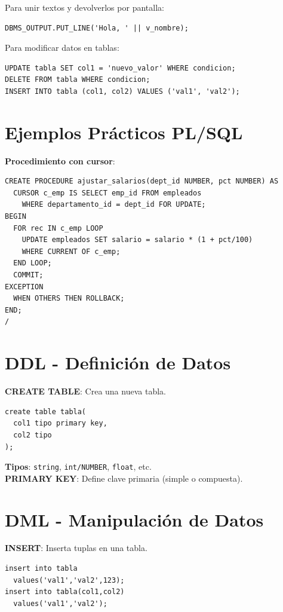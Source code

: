 \documentclass[8pt,a4paper,twocolumn]{article}
\begin{document}
Para unir textos y devolverlos por pantalla:
\begin{lstlisting}
DBMS_OUTPUT.PUT_LINE('Hola, ' || v_nombre);
\end{lstlisting}

Para modificar datos en tablas:
\begin{lstlisting}
UPDATE tabla SET col1 = 'nuevo_valor' WHERE condicion;
DELETE FROM tabla WHERE condicion;
INSERT INTO tabla (col1, col2) VALUES ('val1', 'val2');
\end{lstlisting}

\section{Ejemplos Prácticos PL/SQL}

\textbf{Procedimiento con cursor}:
\begin{lstlisting}
CREATE PROCEDURE ajustar_salarios(dept_id NUMBER, pct NUMBER) AS
  CURSOR c_emp IS SELECT emp_id FROM empleados
    WHERE departamento_id = dept_id FOR UPDATE;
BEGIN
  FOR rec IN c_emp LOOP
    UPDATE empleados SET salario = salario * (1 + pct/100)
    WHERE CURRENT OF c_emp;
  END LOOP;
  COMMIT;
EXCEPTION
  WHEN OTHERS THEN ROLLBACK;
END;
/
\end{lstlisting}

\section{DDL - Definición de Datos}

\textbf{CREATE TABLE}: Crea una nueva tabla.
\begin{lstlisting}
create table tabla(
  col1 tipo primary key,
  col2 tipo
);
\end{lstlisting}

\textbf{Tipos}: \texttt{string}, \texttt{int/NUMBER}, \texttt{float}, etc.\\
\textbf{PRIMARY KEY}: Define clave primaria (simple o compuesta).

\section{DML - Manipulación de Datos}

\textbf{INSERT}: Inserta tuplas en una tabla.
\begin{lstlisting}
insert into tabla 
  values('val1','val2',123);
insert into tabla(col1,col2) 
  values('val1','val2');
\end{lstlisting}
\end{document}
